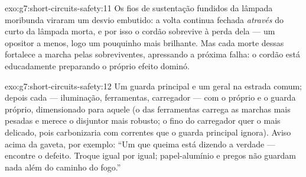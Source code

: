 \begin{solution}{exo:g7:short-circuits-safety:11}
Os fios de sustentação fundidos da lâmpada moribunda viraram um
desvio embutido: a volta continua fechada \emph{através} do curto da
lâmpada morta, e por isso o cordão sobrevive à perda dela --- um
opositor a menos, logo um pouquinho mais brilhante. Mas cada morte
dessas fortalece a marcha pelas sobreviventes, apressando a próxima
falha: o cordão está educadamente preparando o próprio efeito
dominó.
\end{solution}

\begin{solution}{exo:g7:short-circuits-safety:12}
Um guarda principal e um  geral na estrada comum; depois
cada  --- iluminação, ferramentas, carregador --- com o
 próprio e o guarda próprio, dimensionado para aquele 
(o  das ferramentas carrega as marchas mais pesadas e merece o
disjuntor mais robusto; o  fino do carregador quer o  mais
delicado, pois carbonizaria com correntes que o guarda principal
ignora). Aviso acima da gaveta, por exemplo: ``Um  que queima
está dizendo a verdade --- encontre o defeito. Troque igual por
igual; papel-alumínio e pregos não guardam nada além do caminho do
fogo.''
\end{solution}

